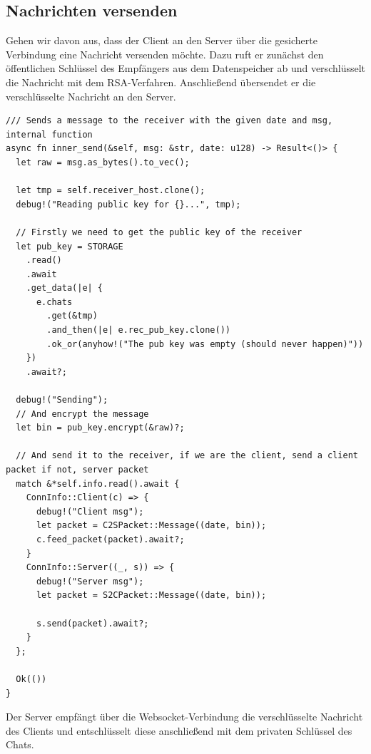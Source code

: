 \documentclass[a4paper,ngerman, headheight=28pt,12pt]{scrartcl}
\begin{document}
\subsection{Nachrichten versenden}
Gehen wir davon aus, dass der Client an den Server über die gesicherte Verbindung eine Nachricht versenden möchte. Dazu ruft er zunächst den öffentlichen Schlüssel des Empfängers aus dem Datenspeicher ab und verschlüsselt die Nachricht mit dem RSA-Verfahren. Anschließend übersendet er die verschlüsselte Nachricht an den Server.
\begin{verbatim}
/// Sends a message to the receiver with the given date and msg, internal function
async fn inner_send(&self, msg: &str, date: u128) -> Result<()> {
  let raw = msg.as_bytes().to_vec();

  let tmp = self.receiver_host.clone();
  debug!("Reading public key for {}...", tmp);

  // Firstly we need to get the public key of the receiver
  let pub_key = STORAGE
    .read()
    .await
    .get_data(|e| {
      e.chats
        .get(&tmp)
        .and_then(|e| e.rec_pub_key.clone())
        .ok_or(anyhow!("The pub key was empty (should never happen)"))
    })
    .await?;

  debug!("Sending");
  // And encrypt the message
  let bin = pub_key.encrypt(&raw)?;

  // And send it to the receiver, if we are the client, send a client packet if not, server packet
  match &*self.info.read().await {
    ConnInfo::Client(c) => {
      debug!("Client msg");
      let packet = C2SPacket::Message((date, bin));
      c.feed_packet(packet).await?;
    }
    ConnInfo::Server((_, s)) => {
      debug!("Server msg");
      let packet = S2CPacket::Message((date, bin));

      s.send(packet).await?;
    }
  };

  Ok(())
}
\end{verbatim}
Der Server empfängt über die Websocket-Verbindung die verschlüsselte Nachricht des Clients und entschlüsselt diese anschließend mit dem privaten Schlüssel des Chats.
\end{document}
